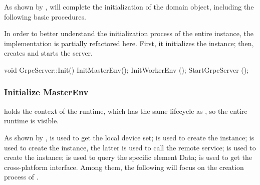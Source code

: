 \begin{content}
As shown by ,  will complete the initialization of the  domain object, including the following  basic procedures.

\begin{enum}
    \begin{enum}
    \begin{nitemize}
    \end{nitemize}
    \begin{nitemize}
    \end{nitemize}
    \end{enum}
\end{enum}

In order to better understand the initialization process of the entire  instance, the implementation is partially refactored here. First, it initializes the  instance; then, creates and starts the  server.

\begin{leftbar}
\begin{c++}
void GrpcServer::Init() {
  InitMasterEnv();
  InitWorkerEnv ();
  StartGrpcServer ();
}
\end{c++}
\end{leftbar}


\subsubsection{Initialize MasterEnv}
 holds the context of the  runtime, which has the same lifecycle as , so the entire  runtime is visible.

As shown by ,  is used to get the local device set;  is used to create the  instance;  is used to create the  instance, the latter is used to call the remote  service;  is used to create the  instance;  is used to query the specific  element Data;  is used to get the cross-platform  interface. Among them, the following will focus on the creation process of .


\end{content}
